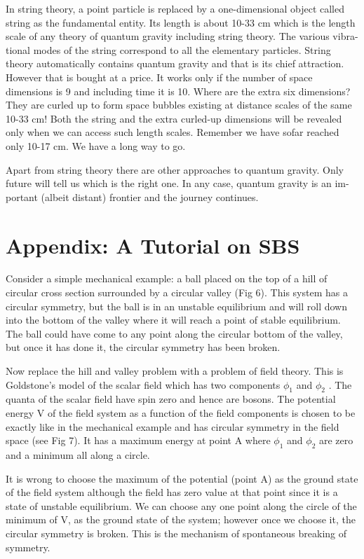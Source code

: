 In string theory, a point particle is replaced by a one-dimensional object called
string as the fundamental entity. Its length is about 10-33 cm which is the length
scale of any theory of quantum gravity including string theory. The various vibra-
tional modes of the string correspond to all the elementary particles. String theory
automatically contains quantum gravity and that is its chief attraction. However
that is bought at a price. It works only if the number of space dimensions is 9
and including time it is 10. Where are the extra six dimensions? They are curled
up to form space bubbles existing at distance scales of the same 10-33 cm! Both
the string and the extra curled-up dimensions will be revealed only when we can
access such length scales. Remember we have sofar reached only 10-17 cm. We
have a long way to go.

Apart from string theory there are other approaches to quantum gravity. Only
future will tell us which is the right one. In any case, quantum gravity is an im-
portant (albeit distant) frontier and the journey continues.

\section*{Appendix: A Tutorial on SBS}

Consider a simple mechanical example: a ball placed on the top of a hill of circular cross section surrounded by a circular valley (Fig 6). This system has a
circular symmetry, but the ball is in an unstable equilibrium and will roll down
into the bottom of the valley where it will reach a point of stable equilibrium. The
ball could have come to any point along the circular bottom of the valley, but once
it has done it, the circular symmetry has been broken.


Now replace the hill and valley problem with a problem of field theory. This
is Goldstone’s model of the scalar field which has two components $\phi_{1}$ and $\phi_{2}$ .
The quanta of the scalar field have spin zero and hence are bosons. The potential
energy V of the field system as a function of the field components is chosen to
be exactly like in the mechanical example and has circular symmetry in the field
space (see Fig 7). It has a maximum energy at point A where $\phi_{1}$ and $\phi_{2}$ are zero
and a minimum all along a circle.


It is wrong to choose the maximum of the potential (point A) as the ground
state of the field system although the field has zero value at that point since it is a
state of unstable equilibrium. We can choose any one point along the circle of the
minimum of V, as the ground state of the system; however once we choose it, the
circular symmetry is broken. This is the mechanism of spontaneous breaking of
symmetry.


